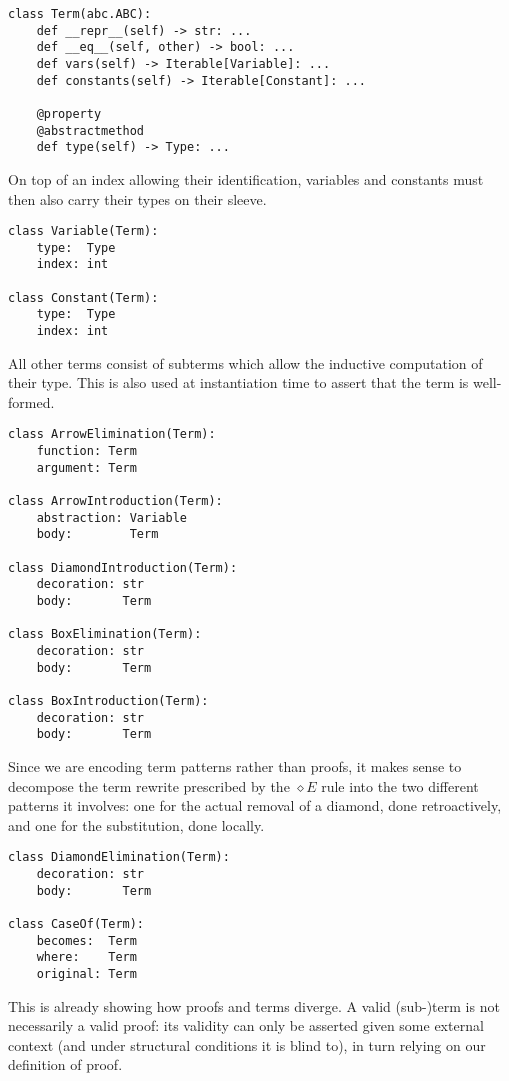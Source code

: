 \begin{verbatim}
class Term(abc.ABC):
    def __repr__(self) -> str: ...
    def __eq__(self, other) -> bool: ...
    def vars(self) -> Iterable[Variable]: ...
    def constants(self) -> Iterable[Constant]: ...

    @property
    @abstractmethod
    def type(self) -> Type: ...
\end{verbatim}

\noindent On top of an index allowing their identification, variables and constants must then also carry their types on their sleeve.

\begin{verbatim}
class Variable(Term):
    type:  Type
    index: int
    
class Constant(Term):
    type:  Type
    index: int
\end{verbatim}

\noindent All other terms consist of subterms which allow the inductive computation of their type.
This is also used at instantiation time to assert that the term is well-formed.

\begin{verbatim}
class ArrowElimination(Term):
    function: Term
    argument: Term

class ArrowIntroduction(Term):
    abstraction: Variable
    body:        Term

class DiamondIntroduction(Term):
    decoration: str
    body:       Term

class BoxElimination(Term):
    decoration: str
    body:       Term

class BoxIntroduction(Term):
    decoration: str
    body:       Term
\end{verbatim}

\noindent Since we are encoding term patterns rather than proofs, it makes sense to decompose the term rewrite prescribed by the $\diamond E$ rule into the two different patterns it involves: one for the actual removal of a diamond, done retroactively, and one for the substitution, done locally.

\begin{verbatim}
class DiamondElimination(Term):
    decoration: str
    body:       Term

class CaseOf(Term):
    becomes:  Term
    where:    Term
    original: Term
\end{verbatim}

\noindent This is already showing how proofs and terms diverge.
A valid (sub-)term is not necessarily a valid proof:  its validity can only be asserted given some external context (and under structural conditions it is blind to), in turn relying on our definition of proof.

